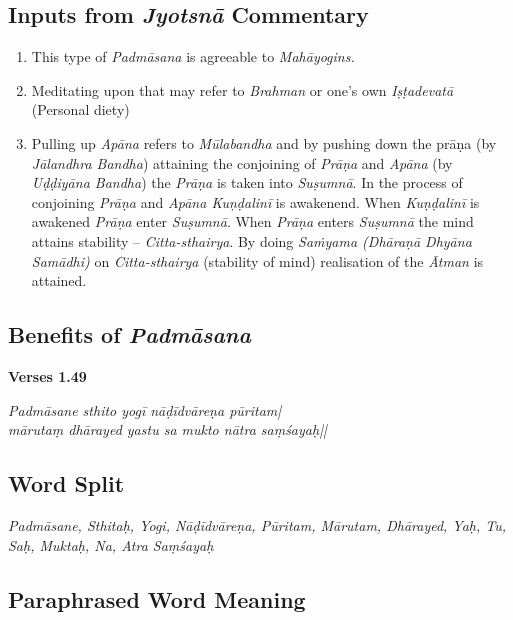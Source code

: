 \subsection*{Inputs from \textit{Jyotsnā} Commentary}


\begin{enumerate}
\item This type of \textit{Padmāsana} is agreeable to \textit{Mahāyogins.} 
\item Meditating upon that may refer to \textit{Brahman} or one’s own \textit{Iṣṭadevatā} (Personal diety)
\item Pulling up \textit{Apāna} refers to \textit{Mūlabandha} and by pushing down the prāṇa (by \textit{Jālandhra Bandha}) attaining the conjoining of \textit{Prāṇa} and \textit{Apāna} (by \textit{Uḍḍiyāna Bandha}) the \textit{Prāṇa} is taken into \textit{Suṣumnā}. In the process of conjoining \textit{Prāṇa} and \textit{Apāna Kuṇḍalinī} is awakenend. When \textit{Kuṇḍalinī} is awakened \textit{Prāṇa} enter \textit{Suṣumnā}. When \textit{Prāṇa} enters \textit{Suṣumnā} the mind attains stability – \textit{Citta-sthairya}. By doing \textit{Saṁyama (Dhāraṇā Dhyāna Samādhi)} on \textit{Citta-sthairya} (stability of mind) realisation of the \textit{Ātman} is attained.
\end{enumerate}

\subsection*{Benefits of \textit{Padmāsana}}


\noindent \textbf{Verses 1.49}

\begin{shloka}
\textit{Padmāsane sthito yogī nāḍīdvāreṇa pūritam|\\
mārutaṃ dhārayed yastu sa mukto nātra saṃśayaḥ||}
\end{shloka}

\subsection*{Word Split}


\textit{Padmāsane, Sthitaḥ, Yogi, Nāḍīdvāreṇa, Pūritam, Mārutam, Dhārayed, Yaḥ, Tu, Saḥ, Muktaḥ, Na, Atra Saṃśayaḥ}

\subsection*{Paraphrased Word Meaning}


